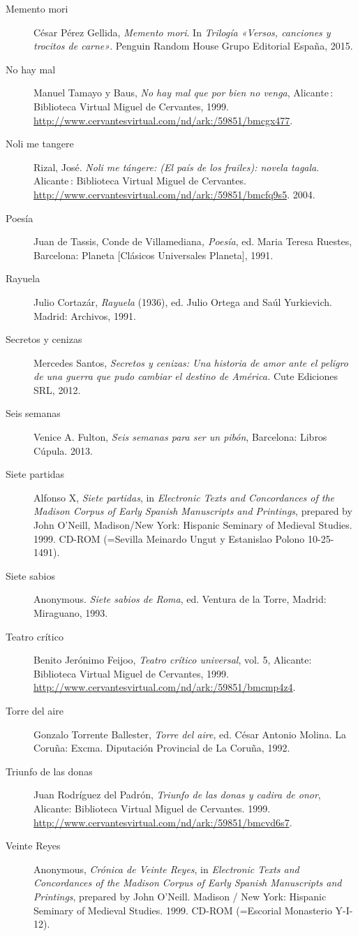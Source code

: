 \begin{flushleft}
\begin{description}
\item[Memento mori]César Pérez Gellida, \textit{Memento mori}. In \textit{Trilogía «Versos, canciones y trocitos de carne»}. Penguin Random House Grupo Editorial España, 2015.
\item[No hay mal]Manuel Tamayo y Baus, \textit{No hay mal que por bien no venga}, Alicante : Biblioteca Virtual Miguel de Cervantes, 1999. \url{http://www.cervantesvirtual.com/nd/ark:/59851/bmcgx477}.
\item[Noli me tangere]Rizal, José. \textit{Noli me tángere: (El país de los frailes): novela tagala}. Alicante : Biblioteca Virtual Miguel de Cervantes. \url{http://www.cervantesvirtual.com/nd/ark:/59851/bmcfq9s5}. 2004.
\item[Poesía]Juan de Tassis, Conde de Villamediana\textit{, Poesía}, ed. Maria Teresa Ruestes, Barcelona: Planeta [Clásicos Universales Planeta], 1991.
\item[Rayuela]Julio Cortazár, \textit{Rayuela} (1936), ed. Julio Ortega and Saúl Yurkievich. Madrid: Archivos, 1991.
\item[Secretos y cenizas]Mercedes Santos, \textit{Secretos y cenizas: Una historia de amor ante el peligro de una guerra que pudo cambiar el destino de América.} Cute Ediciones SRL, 2012.
\item[Seis semanas]Venice A. Fulton, \textit{Seis semanas para ser un pibón}, Barcelona: Libros Cúpula. 2013.
\item[Siete partidas]Alfonso X, \textit{Siete partidas}, in \textit{Electronic Texts and Concordances of the Madison Corpus of Early Spanish Manuscripts and Printings}, prepared by John O’Neill, Madison/New York: Hispanic Seminary of Medieval Studies. 1999. CD-ROM (=Sevilla Meinardo Ungut y Estanislao Polono 10-25-1491).
\item[Siete sabios]Anonymous. \textit{Siete sabios de Roma}, ed. Ventura de la Torre, Madrid: Miraguano, 1993.
\item[Teatro crítico]Benito Jerónimo Feijoo, \textit{Teatro crítico universal}, vol. 5, Alicante: Biblioteca Virtual Miguel de Cervantes, 1999. \url{http://www.cervantesvirtual.com/nd/ark:/59851/bmcmp4z4}.
\item[Torre del aire]Gonzalo Torrente Ballester, \textit{Torre del aire}, ed. César Antonio Molina. La Coruña: Excma. Diputación Provincial de La Coruña, 1992.
\item[Triunfo de las donas]Juan Rodríguez del Padrón, \textit{Triunfo de las donas y cadira de onor}, Alicante: Biblioteca Virtual Miguel de Cervantes. 1999. \url{http://www.cervantesvirtual.com/nd/ark:/59851/bmcvd6s7}.
\item[Veinte Reyes]Anonymous, \textit{Crónica de Veinte Reyes}, in \textit{Electronic Texts and Concordances of the Madison Corpus of Early Spanish Manuscripts and Printings}, prepared by John O’Neill. Madison / New York: Hispanic Seminary of Medieval Studies. 1999. CD-ROM (=Escorial Monasterio Y-I-12).\\
\end{description}
\end{flushleft}
\fussy
